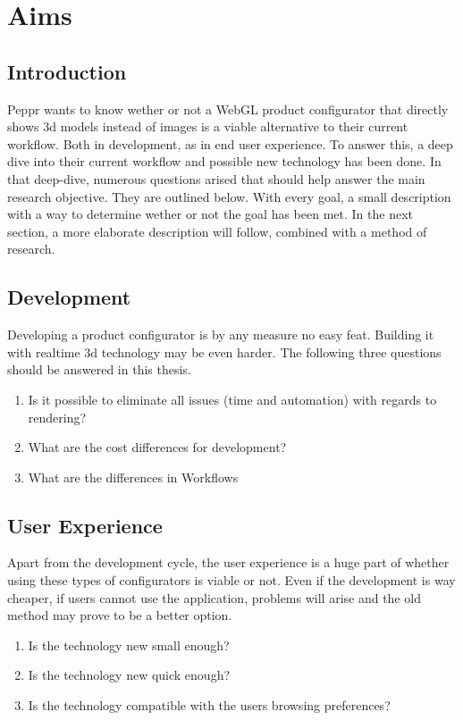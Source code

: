 \chapter{Aims}
\section{Introduction}
Peppr wants to know wether or not a WebGL product configurator that directly shows 3d models instead of images is a viable alternative to their current workflow. Both in development, as in end user experience. To answer this, a deep dive into their current workflow and possible new technology has been done. In that deep-dive, numerous questions arised that should help answer the main research objective. They are outlined below. With every goal, a small description with a way to determine wether or not the goal has been met. In the next section, a more elaborate description will follow, combined with a method of research.
\section{Development}
Developing a product configurator is by any measure no easy feat. Building it with realtime 3d technology may be even harder. The following three questions should be answered in this thesis.
​\begin{enumerate}
\item {Is it possible to eliminate all issues (time and automation) with regards to rendering?}
\item{What are the cost differences for development?}
\item {What are the differences in Workflows}
\end{enumerate}

\section{User Experience}
Apart from the development cycle, the user experience is a huge part of whether using these types of configurators is viable or not. Even if the development is way cheaper, if users cannot use the application, problems will arise and the old method may prove to be a better option.\begin{enumerate}
\item {Is the technology new small enough?}
\item {Is the technology new quick enough?}
\item {Is the technology compatible with the users browsing preferences?}
\end{enumerate}